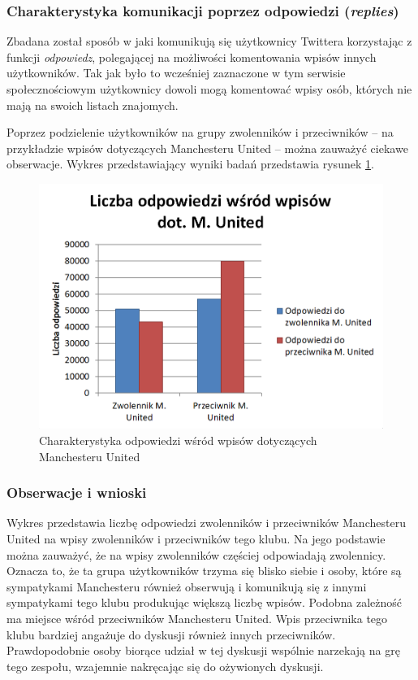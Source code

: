 \clearpage
\subsubsection{Charakterystyka komunikacji poprzez odpowiedzi (\textit{replies})}
Zbadana został sposób w jaki komunikują się użytkownicy Twittera korzystając
z funkcji \textit{odpowiedz}, polegającej na możliwości komentowania wpisów
innych użytkowników. Tak jak było to wcześniej zaznaczone w tym serwisie
społecznościowym użytkownicy dowoli mogą komentować wpisy osób, których
nie mają na swoich listach znajomych.

Poprzez podzielenie użytkowników na grupy zwolenników i przeciwników -- na
przykładzie wpisów dotyczących Manchesteru United -- można zauważyć ciekawe
obserwacje. Wykres przedstawiający wyniki badań przedstawia rysunek 
\ref{image:replies-munited}.


\begin{figure}[ht!]
\centering
\includegraphics[width=120mm]{img/replies-munited.png}
\caption{Charakterystyka odpowiedzi wśród wpisów dotyczących Manchesteru United}
\label{image:replies-munited}
\end{figure}

\subsubsection{Obserwacje i wnioski}
Wykres przedstawia liczbę odpowiedzi zwolenników i przeciwników Manchesteru 
United na wpisy zwolenników i przeciwników tego klubu. Na jego podstawie można
zauważyć, że na wpisy zwolenników częściej odpowiadają zwolennicy. 
Oznacza to, że ta grupa użytkowników trzyma się blisko siebie i osoby, które
są sympatykami Manchesteru również obserwują i komunikują się z innymi 
sympatykami tego klubu produkując większą liczbę wpisów.
Podobna zależność ma miejsce wśród przeciwników Manchesteru United.
Wpis przeciwnika tego klubu bardziej angażuje do dyskusji również innych
przeciwników. Prawdopodobnie osoby biorące udział w tej dyskusji wspólnie
narzekają na grę tego zespołu, wzajemnie nakręcając się do ożywionych dyskusji.


